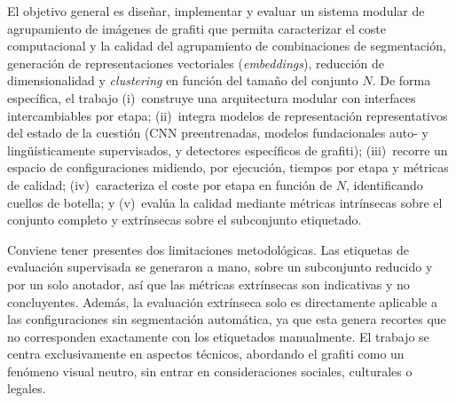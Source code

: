 El objetivo general es diseñar, implementar y evaluar un sistema modular de
agrupamiento de imágenes de grafiti que permita caracterizar el coste
computacional y la calidad del agrupamiento de combinaciones de segmentación,
generación de representaciones vectoriales (\textit{embeddings}), reducción de
dimensionalidad y \textit{clustering} en función del tamaño del conjunto $N$.
De forma específica, el trabajo (i)~construye una arquitectura modular con
interfaces intercambiables por etapa; (ii)~integra modelos de representación
representativos del estado de la cuestión (CNN preentrenadas, modelos
fundacionales auto- y lingüísticamente supervisados, y detectores específicos de
grafiti); (iii)~recorre un espacio de configuraciones midiendo, por ejecución,
tiempos por etapa y métricas de calidad; (iv)~caracteriza el coste por etapa en
función de $N$, identificando cuellos de botella; y (v)~evalúa la calidad
mediante métricas intrínsecas sobre el conjunto completo y extrínsecas sobre el
subconjunto etiquetado.

Conviene tener presentes dos limitaciones metodológicas. Las etiquetas de
evaluación supervisada se generaron a mano, sobre un subconjunto reducido y por
un solo anotador, así que las métricas extrínsecas son indicativas y no
concluyentes. Además, la evaluación extrínseca solo es directamente aplicable a
las configuraciones sin segmentación automática, ya que esta genera recortes que
no corresponden exactamente con los etiquetados manualmente. El trabajo se centra
exclusivamente en aspectos técnicos, abordando el grafiti como un fenómeno visual
neutro, sin entrar en consideraciones sociales, culturales o legales.
